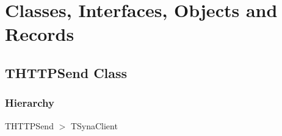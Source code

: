\documentclass{report}
\newif\ifpdf
\begin{document}
\section{Classes, Interfaces, Objects and Records}
\ifpdf
\subsection*{\large{\textbf{THTTPSend Class}}\normalsize\hspace{1ex}\hrulefill}
\else
\subsection*{THTTPSend Class}
\fi
\label{httpsend.THTTPSend}
\subsubsection*{\large{\textbf{Hierarchy}}\normalsize\hspace{1ex}\hfill}
THTTPSend {$>$} TSynaClient
\end{document}
